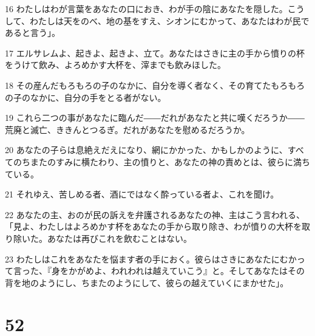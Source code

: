 \par 16 わたしはわが言葉をあなたの口におき、わが手の陰にあなたを隠した。こうして、わたしは天をのべ、地の基をすえ、シオンにむかって、あなたはわが民であると言う」。
\par 17 エルサレムよ、起きよ、起きよ、立て。あなたはさきに主の手から憤りの杯をうけて飲み、よろめかす大杯を、滓までも飲みほした。
\par 18 その産んだもろもろの子のなかに、自分を導く者なく、その育てたもろもろの子のなかに、自分の手をとる者がない。
\par 19 これら二つの事があなたに臨んだ――だれがあなたと共に嘆くだろうか――荒廃と滅亡、ききんとつるぎ。だれがあなたを慰めるだろうか。
\par 20 あなたの子らは息絶えだえになり、網にかかった、かもしかのように、すべてのちまたのすみに横たわり、主の憤りと、あなたの神の責めとは、彼らに満ちている。
\par 21 それゆえ、苦しめる者、酒にではなく酔っている者よ、これを聞け。
\par 22 あなたの主、おのが民の訴えを弁護されるあなたの神、主はこう言われる、「見よ、わたしはよろめかす杯をあなたの手から取り除き、わが憤りの大杯を取り除いた。あなたは再びこれを飲むことはない。
\par 23 わたしはこれをあなたを悩ます者の手におく。彼らはさきにあなたにむかって言った、『身をかがめよ、われわれは越えていこう』と。そしてあなたはその背を地のようにし、ちまたのようにして、彼らの越えていくにまかせた」。

\chapter{52}

